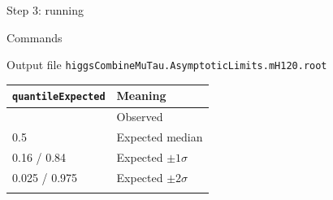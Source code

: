 \begin{frame}[fragile]{Step 3: running}
\protect{}\label{step-3-running}
\begin{block}{Commands}
\protect{}\label{commands}
\begin{Shaded}
\begin{Highlighting}[]
\DataTypeTok{\textbackslash{}}
    \DataTypeTok{\textbackslash{}}

 \DataTypeTok{\textbackslash{}}
\end{Highlighting}
\end{Shaded}
\end{block}

\begin{block}{Output file}
\protect{}\label{output-file}
\texttt{higgsCombineMuTau.AsymptoticLimits.mH120.root}

\begin{longtable}[]{@{}ll@{}}
\toprule\noalign{}
\texttt{quantileExpected} & Meaning \\
\midrule\noalign{}
\endhead
-1 & Observed \\
0.5 & Expected median \\
0.16 / 0.84 & Expected \(\pm 1\sigma\) \\
0.025 / 0.975 & Expected \(\pm 2\sigma\) \\
\bottomrule\noalign{}
\end{longtable}
\end{block}
\end{frame}

